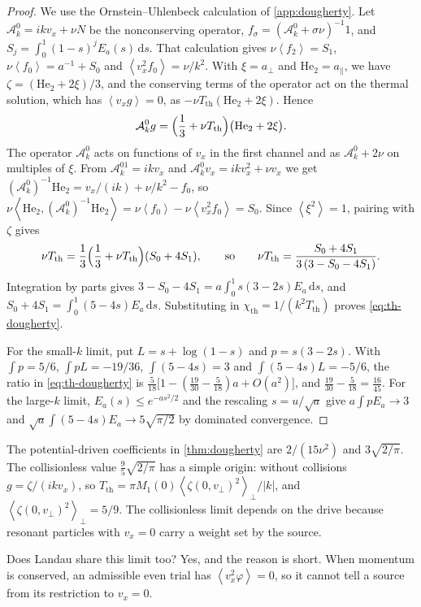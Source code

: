 \documentclass[11pt]{article}
\newcommand{\dd}{\,\mathrm d}
\newcommand{\av}[1]{\left\langle #1\right\rangle}
\newcommand{\A}{\mathcal A}
\newcommand{\thr}{\mathrm{th}}
\theoremstyle{definition}
\theoremstyle{remark}
\numberwithin{equation}{section}
\begin{document}
\begin{proof}
We use the Ornstein--Uhlenbeck calculation of \cref{app:dougherty}.
Let $\A_k^0=ikv_x+\nu N$ be the nonconserving operator,
$f_\sigma=(\A_k^0+\sigma\nu)^{-1}1$, and
$S_j=\int_0^1(1-s)^jE_a(s)\dd s$. That calculation gives
$\nu\av{f_2}=S_1$, $\nu\av{f_0}=a^{-1}+S_0$ and
$\av{v_x^2f_0}=\nu/k^2$. With $\xi=a_\perp$ and $\mathrm{He}_2=a_\parallel$,
we have $\zeta=(\mathrm{He}_2+2\xi)/3$, and the conserving terms of the
operator act on the thermal solution, which has $\av{v_xg}=0$, as
$-\nu T_\thr(\mathrm{He}_2+2\xi)$. Hence
\[
 \A_k^0g=\Bigl(\frac13+\nu T_\thr\Bigr)\bigl(\mathrm{He}_2+2\xi\bigr).
\]
The operator $\A_k^0$ acts on functions of $v_x$ in the first channel and
as $\A_k^0+2\nu$ on multiples of $\xi$. From $\A_k^01=ikv_x$ and
$\A_k^0v_x=ikv_x^2+\nu v_x$ we get
$(\A_k^0)^{-1}\mathrm{He}_2=v_x/(ik)+\nu/k^2-f_0$, so
$\nu\av{\mathrm{He}_2,(\A_k^0)^{-1}\mathrm{He}_2}
=\nu\av{f_0}-\nu\av{v_x^2f_0}=S_0$.
Since $\av{\xi^2}=1$, pairing with $\zeta$ gives
\[
 \nu T_\thr=\frac13\Bigl(\frac13+\nu T_\thr\Bigr)(S_0+4S_1),
 \qquad\text{so}\qquad
 \nu T_\thr=\frac{S_0+4S_1}{3\,(3-S_0-4S_1)} .
\]
Integration by parts gives
$3-S_0-4S_1=a\int_0^1s(3-2s)E_a\dd s$, and
$S_0+4S_1=\int_0^1(5-4s)E_a\dd s$. Substituting in
$\chi_\thr=1/(k^2T_\thr)$ proves \eqref{eq:th-dougherty}.

For the small-$k$ limit, put $L=s+\log(1-s)$ and $p=s(3-2s)$. With
$\int p=5/6$, $\int pL=-19/36$, $\int(5-4s)=3$ and
$\int(5-4s)L=-5/6$, the ratio in \eqref{eq:th-dougherty} is
$\tfrac5{18}\bigl[1-(\tfrac{19}{30}-\tfrac5{18})a+O(a^2)\bigr]$, and
$\tfrac{19}{30}-\tfrac5{18}=\tfrac{16}{45}$. For the large-$k$ limit,
$E_a(s)\leq e^{-as^2/2}$ and the rescaling $s=u/\sqrt a$ give
$a\int pE_a\to3$ and $\sqrt a\int(5-4s)E_a\to5\sqrt{\pi/2}$ by dominated
convergence.
\end{proof}

The potential-driven coefficients in \cref{thm:dougherty} are $2/(15\nu^2)$ and
$3\sqrt{2/\pi}$. The collisionless value $\tfrac95\sqrt{2/\pi}$ has a
simple origin: without collisions $g=\zeta/(ikv_x)$, so
$T_\thr=\pi M_1(0)\av{\zeta(0,v_\perp)^2}_\perp/|k|$, and
$\av{\zeta(0,v_\perp)^2}_\perp=5/9$. The collisionless limit depends on
the drive because resonant particles with $v_x=0$ carry a weight set by
the source.

Does Landau share this limit too? Yes, and the reason is short. When
momentum is conserved, an admissible even trial has $\av{v_x^2\varphi}=0$,
so it cannot tell a source from its restriction to $v_x=0$.
\end{document}
